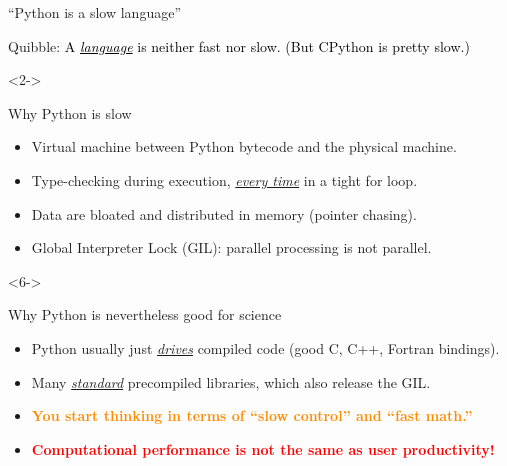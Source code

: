 \documentclass[aspectratio=169]{beamer}
\begin{document}
\begin{frame}{``Python is a slow language''}
\vspace{0.2 cm}
\begin{block}{Quibble: \textcolor{black}{A \underline{\it language} is neither fast nor slow. (But CPython is pretty slow.)}}
\end{block}

\begin{uncoverenv}<2->
\vspace{-0.2 cm}
\begin{block}{Why Python is slow}
\begin{itemize}
\item<2-> Virtual machine between Python bytecode and the physical machine.
\item<3-> Type-checking during execution, \underline{\it every time} in a tight for loop.
\item<4-> Data are bloated and distributed in memory (pointer chasing).
\item<5-> Global Interpreter Lock (GIL): parallel processing is not parallel.
\end{itemize}
\end{block}
\end{uncoverenv}

\begin{uncoverenv}<6->
\begin{block}{Why Python is nevertheless good for science}
\begin{itemize}
\item<6-> Python usually just \underline{\it drives} compiled code (good C, C++, Fortran bindings).
\item<7-> Many \underline{\it standard} precompiled libraries, which also release the GIL.
\item<8-> \textcolor{darkorange}{\bf You start thinking in terms of ``slow control'' and ``fast math.''}
\item<9-> \textcolor{red}{\bf Computational performance is not the same as user productivity!}
\end{itemize}
\end{block}
\end{uncoverenv}
\end{frame}
\end{document}
